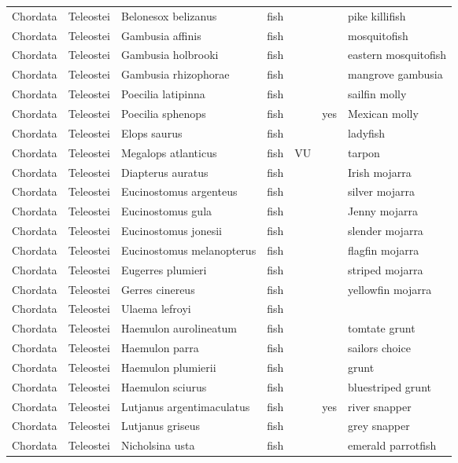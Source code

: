 \begin{longtable}{lllllll}
  Chordata & Teleostei & Belonesox belizanus & fish &  &  & pike killifish \\ 
  Chordata & Teleostei & Gambusia affinis & fish &  &  & mosquitofish \\ 
  Chordata & Teleostei & Gambusia holbrooki & fish &  &  & eastern mosquitofish \\ 
  Chordata & Teleostei & Gambusia rhizophorae & fish &  &  & mangrove gambusia \\ 
  Chordata & Teleostei & Poecilia latipinna & fish &  &  & sailfin molly \\ 
  Chordata & Teleostei & Poecilia sphenops & fish &  & yes & Mexican molly \\ 
  Chordata & Teleostei & Elops saurus & fish &  &  & ladyfish \\ 
  Chordata & Teleostei & Megalops atlanticus & fish & VU &  & tarpon \\ 
  Chordata & Teleostei & Diapterus auratus & fish &  &  & Irish mojarra \\ 
  Chordata & Teleostei & Eucinostomus argenteus & fish &  &  & silver mojarra \\ 
  Chordata & Teleostei & Eucinostomus gula & fish &  &  & Jenny mojarra \\ 
  Chordata & Teleostei & Eucinostomus jonesii & fish &  &  & slender mojarra \\ 
  Chordata & Teleostei & Eucinostomus melanopterus & fish &  &  & flagfin mojarra \\ 
  Chordata & Teleostei & Eugerres plumieri & fish &  &  & striped mojarra \\ 
  Chordata & Teleostei & Gerres cinereus & fish &  &  & yellowfin mojarra \\ 
  Chordata & Teleostei & Ulaema lefroyi & fish &  &  &  \\ 
  Chordata & Teleostei & Haemulon aurolineatum & fish &  &  & tomtate grunt \\ 
  Chordata & Teleostei & Haemulon parra & fish &  &  & sailors choice \\ 
  Chordata & Teleostei & Haemulon plumierii & fish &  &  & grunt \\ 
  Chordata & Teleostei & Haemulon sciurus & fish &  &  & bluestriped grunt \\ 
  Chordata & Teleostei & Lutjanus argentimaculatus & fish &  & yes & river snapper \\ 
  Chordata & Teleostei & Lutjanus griseus & fish &  &  & grey snapper \\ 
  Chordata & Teleostei & Nicholsina usta & fish &  &  & emerald parrotfish \\ 

\end{longtable}
